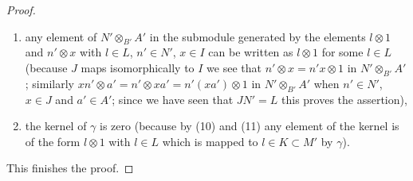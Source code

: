 \begin{proof}
\begin{enumerate}
is generated by elements $l \otimes 1$ and $n' \otimes x$ with
$l \in K$, $n' \in N'$, $x \in I$ (because $M = N \otimes_B A$ by assumption
and because $N' \to N$ and $A' \to A$ are surjective with kernels
$L$ and $I$),
\item any element of $N' \otimes_{B'} A'$ in the submodule generated
by the elements $l \otimes 1$ and $n' \otimes x$ with
$l \in L$, $n' \in N'$, $x \in I$ can be written as $l \otimes 1$
for some $l \in L$ (because $J$ maps isomorphically to $I$ we see
that $n' \otimes x = n'x \otimes 1$ in $N' \otimes_{B'} A'$;
similarly $x n' \otimes a' = n' \otimes xa' = n'(xa') \otimes 1$
in $N' \otimes_{B'} A'$ when $n' \in N'$, $x \in J$ and $a' \in A'$;
since we have seen that $JN' = L$ this proves the assertion),
\item the kernel of $\gamma$ is zero (because by (10) and (11) any element of
the kernel is of the form $l \otimes 1$ with $l \in L$ which
is mapped to $l \in K \subset M'$ by $\gamma$).
\end{enumerate}
This finishes the proof.
\end{proof}
